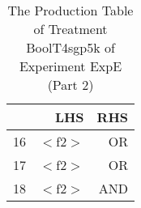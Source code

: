 \begin{table}[ht]
\centering
\begin{tabular}{rrr}
  \hline
 & LHS & RHS \\ 
  \hline
16 & $<$f2$>$ & OR \\ 
  17 & $<$f2$>$ & OR \\ 
  18 & $<$f2$>$ & AND \\ 
   \hline
\end{tabular}
\caption{The Production Table of Treatment BoolT4sgp5k of Experiment ExpE (Part 2)} 
\end{table}
